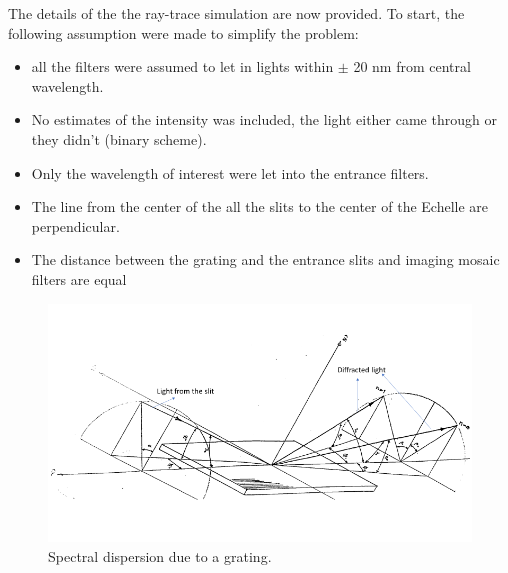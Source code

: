 \documentclass[crop=false,class=mitthesis,oneside,font=12pt]{standalone}
\begin{document}
The details of the the ray-trace simulation are now provided. To start, the following assumption were made to simplify the problem:
\begin{itemize}
\item all the filters were assumed to let in lights within $\pm$ 20 nm from central wavelength.
\item No estimates of the intensity was included, the light either came through or they didn't (binary scheme).
\item Only the wavelength of interest were let into the entrance filters.
\item The line from the center of the all the slits to the center of the Echelle are perpendicular.
\item The distance between the grating and the entrance slits and imaging mosaic filters are equal
\end{itemize}
\begin{figure}[H]
	\centering\includegraphics[width=35pc]{grating_stp.png}
	\caption{Spectral dispersion due to a grating. }
	\label{fig:grating}
\end{figure}
\end{document}
